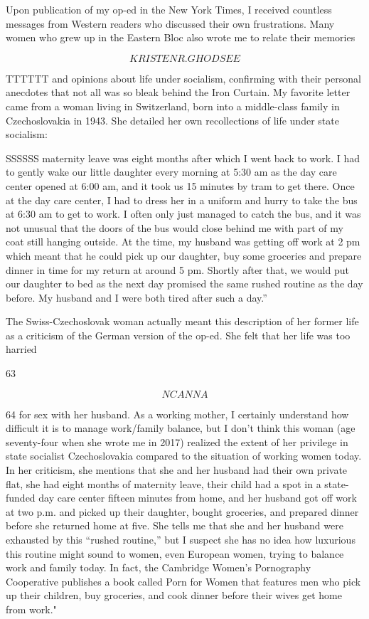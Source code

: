  \par 
Upon publication of my op-ed in the New York Times, I received countless messages from Western readers who discussed their own frustrations. Many women who grew up in the Eastern Bloc also wrote me to relate their memories
 \par 
\[KRISTEN R. GHODSEE\]
 \par 
TTTTTT and opinions about life under socialism, confirming with their personal anecdotes that not all was so bleak behind the Iron Curtain. My favorite letter came from a woman living in Switzerland, born into a middle-class family in Czechoslovakia in 1943. She detailed her own recollections of life under state socialism:
 \par 
SSSSSS maternity leave was eight months after which I went back to work. I had to gently wake our little daughter every morning at 5:30 am as the day care center opened at 6:00 am, and it took us {\color{blue}15} minutes by tram to get there. Once at the day care center, I had to dress her in a uniform and hurry to take the bus at 6:30 am to get to work. I often only just managed to catch the bus, and it was not unusual that the doors of the bus would close behind me with part of my coat still hanging outside. At the time, my husband was getting off work at {\color{blue}2} pm which meant that he could pick up our daughter, buy some groceries and prepare dinner in time for my return at around {\color{blue}5} pm. Shortly after that, we would put our daughter to bed as the next day promised the same rushed routine as the day before. My husband and I were both tired after such a day.”
 \par 
The Swiss-Czechoslovak woman actually meant this description of her former life as a criticism of the German version of the op-ed. She felt that her life was too harried
 \par 
63
 \par 
\[NC ANN A\]
 \par 
64 for sex with her husband. As a working mother, I certainly understand how difficult it is to manage work/family balance, but I don’t think this woman (age seventy-four when she wrote me in 2017) realized the extent of her privilege in state socialist Czechoslovakia compared to the situation of working women today. In her criticism, she mentions that she and her husband had their own private flat, she had eight months of maternity leave, their child had a spot in a state-funded day care center fifteen minutes from home, and her husband got off work at two p.m. and picked up their daughter, bought groceries, and prepared dinner before she returned home at five. She tells me that she and her husband were exhausted by this “rushed routine,” but I suspect she has no idea how luxurious this routine might sound to women, even European women, trying to balance work and family today. In fact, the Cambridge Women’s Pornography Cooperative publishes a book called Porn for Women that features men who pick up their children, buy groceries, and cook dinner before their wives get home from work."
